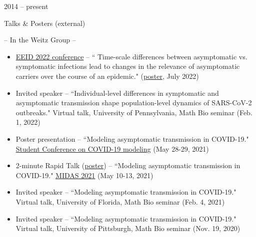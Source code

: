 \documentclass[a4paper,10pt]{article}
\newlength{\cvcolumngapwidth}
\newlength{\cvleftcolumnwidth}
\newlength{\cvrightcolumnwidth}
\newcommand{\cvtitlestyle}[1]{{\large\cvtitlefont\textcolor{cvtitlecolor}{#1}}}
\newcommand{\cvheadingstyle}[1]{{\normalsize\cvheadingfont\textcolor{cvheadingcolor}{#1}}}
\newlength{\cvafteritemskipamount}
\newlength{\cvaftertitleskipamount}
\newlength{\cvparskip}
\newcommand{\cvitem}[2]{
            \begin{minipage}[t]{\cvleftcolumnwidth}
                \raggedleft #1
            \end{minipage}%
            \hspace{\cvcolumngapwidth}%
            \begin{minipage}[t]{\cvrightcolumnwidth}
                \setlength{\parskip}{\cvparskip} #2
            \end{minipage}
        
            \vspace{\cvafteritemskipamount}
        }
\newcommand{\cvtitle}[1]{
            \cvtitlestyle{#1}
        
            \vspace{\cvaftertitleskipamount}
            \vspace{-\cvparskip}
        }
\begin{document}
        \cvitem{
            \cvheadingstyle{2014 -- present}
        }{
        
            \cvtitle{Talks \& Posters (external)}
		-- In the Weitz Group --
            \begin{itemize}[leftmargin=*]
		\item \href{https://www.eeid-2022-emory.org/}{EEID 2022 conference} -- `` Time-scale differences between asymptomatic vs. symptomatic infections lead to changes in the relevance of asymptomatic carriers over the course of an epidemic." (\href{https://github.com/Jeremy-D-Harris/EEID2022poster_asymptomatic}{poster}, July 2022)
		\item Invited speaker -- ``Individual-level differences in symptomatic and asymptomatic transmission shape population-level dynamics of SARS-CoV-2 outbreaks." Virtual talk, University of Pennsylvania, Math Bio seminar (Feb. 1, 2022)
		\item Poster presentation -- ``Modeling asymptomatic transmission in COVID-19."  \href{https://sites.google.com/view/nsfstudentconference2021/home}{\underline{Student Conference on COVID-19 modeling}}  (May 28-29, 2021)
            	\item 2-minute Rapid Talk (\href{https://github.com/Jeremy-D-Harris/poster_MIDAS2021.git}{poster}) -- ``Modeling asymptomatic transmission in COVID-19."  \href{https://midasnetwork.us/midas-network-annual-meeting-midas-2021/}{\underline{MIDAS 2021}}  (May 10-13, 2021) 
		\item Invited speaker -- ``Modeling asymptomatic transmission in COVID-19." Virtual talk, University of Florida, Math Bio seminar (Feb. 4, 2021) 
		\item Invited speaker -- ``Modeling asymptomatic transmission in COVID-19." Virtual talk, University of Pittsburgh, Math Bio seminar (Nov. 19, 2020) 

        	    \end{itemize}

}
\end{document}
